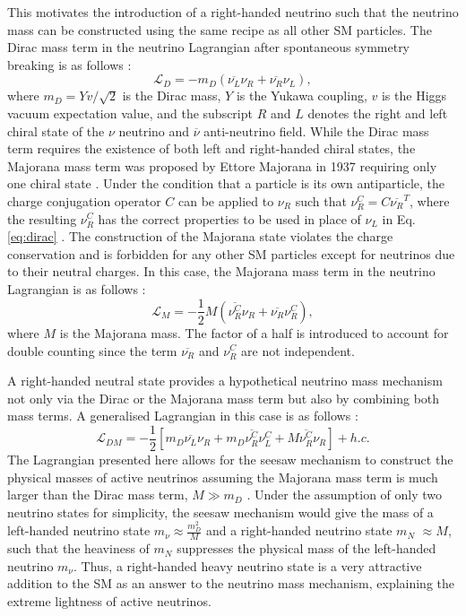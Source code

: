 This motivates the introduction of a right-handed neutrino such that the neutrino mass can be constructed using the same recipe as all other SM particles.
The Dirac mass term in the neutrino Lagrangian after spontaneous symmetry breaking is as follows \cite{Thomson}:
\begin{equation}
\mathcal{L}_{D} = -m_{D} \left(\overline{\nu_{L}}\nu_{R} + \overline{\nu_{R}}\nu_{L}\right),
\label{eq:dirac}
\end{equation}
where $m_{D} = Yv/\sqrt{2}$ is the Dirac mass, $Y$ is the Yukawa coupling, $v$ is the Higgs vacuum expectation value, and the subscript $R$ and $L$ denotes the right and left chiral state of the $\nu$ neutrino and $\overline{\nu}$ anti-neutrino field. 
While the Dirac mass term requires the existence of both left and right-handed chiral states, the Majorana mass term was proposed by Ettore Majorana in 1937 requiring only one chiral state \cite{Majorana}.
Under the condition that a particle is its own antiparticle, the charge conjugation operator $C$ can be applied to $\nu_R$ such that $\nu^{C}_{R}=C\overline{\nu_{R}}^{T}$, where the resulting $\nu_R^C$ has the correct properties to be used in place of $\nu_L$ in Eq. \ref{eq:dirac} \cite{Kim}.
The construction of the Majorana state violates the charge conservation and is forbidden for any other SM particles except for neutrinos due to their neutral charges. 
In this case, the Majorana mass term in the neutrino Lagrangian is as follows \cite{Kim}:
\begin{equation}
	\mathcal{L}_{M} = -\frac{1}{2}M\left(\overline{\nu_{R}^{C}}\nu_{R} + \overline{\nu_{R}}\nu_{R}^{C}\right),
\end{equation}
where $M$ is the Majorana mass. 
The factor of a half is introduced to account for double counting since the term $\overline{\nu_R}$ and $\nu^C_R$ are not independent.

A right-handed neutral state provides a hypothetical neutrino mass mechanism not only via the Dirac or the Majorana mass term but also by combining both mass terms.
A generalised Lagrangian in this case is as follows \cite{Thomson}:
\begin{equation}
        \mathcal{L}_{DM} = -\frac{1}{2}\left[m_D\overline{\nu_{L}}\nu_{R} + m_D\overline{\nu_{R}^{C}}\nu_{L}^C + M\overline{\nu_{R}^{C}}\nu_{R}\right] + h.c.
\end{equation}
The Lagrangian presented here allows for the seesaw mechanism to construct the physical masses of active neutrinos assuming the Majorana mass term is much larger than the Dirac mass term, $M \gg m_D$ \cite{Thomson, nuMass}.
Under the assumption of only two neutrino states for simplicity, the seesaw mechanism would give the mass of a left-handed neutrino state $m_{\nu} \approx \frac{m_D^2}{M}$ and a right-handed neutrino state $m_N$ $\approx M$, such that the heaviness of $m_N$ suppresses the physical mass of the left-handed neutrino $m_\nu$.
Thus, a right-handed heavy neutrino state is a very attractive addition to the SM as an answer to the neutrino mass mechanism, explaining the extreme lightness of active neutrinos.


